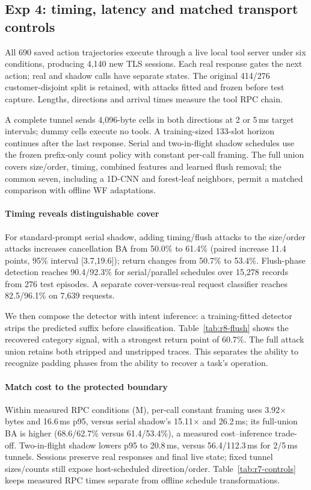 \subsection{Exp 4: timing, latency and matched transport controls}\label{sec:live-timing}\label{sec:r7-main}
All 690 saved action trajectories execute through a live local tool server under six conditions, producing 4,140 new TLS sessions. Each real response gates the next action; real and shadow calls have separate states. The original 414/276 customer-disjoint split is retained, with attacks fitted and frozen before test capture. Lengths, directions and arrival times measure the tool RPC chain.

A complete tunnel sends 4,096-byte cells in both directions at 2 or 5\,ms target intervals; dummy cells execute no tools. A training-sized 133-slot horizon continues after the last response. Serial and two-in-flight shadow schedules use the frozen prefix-only count policy with constant per-call framing. The full union covers size/order, timing, combined features and learned flush removal; the common seven, including a 1D-CNN and forest-leaf neighbors, permit a matched comparison with offline WF adaptations.


\paragraph{Timing reveals distinguishable cover}
For standard-prompt serial shadow, adding timing/flush attacks to the size/order attacks increases cancellation BA from 50.0\% to 61.4\% (paired increase 11.4 points, 95\% interval [3.7,19.6]); return changes from 50.7\% to 53.4\%. Flush-phase detection reaches 90.4/92.3\% for serial/parallel schedules over 15,278 records from 276 test episodes. A separate cover-versus-real request classifier reaches 82.5/96.1\% on 7,639 requests.

We then compose the detector with intent inference: a training-fitted detector strips the predicted suffix before classification. Table~\ref{tab:r8-flush} shows the recovered category signal, with a strongest return point of 60.7\%. The full attack union retains both stripped and unstripped traces. This separates the ability to recognize padding phases from the ability to recover a task's operation.


\paragraph{Match cost to the protected boundary}
Within measured RPC conditions (M), per-call constant framing uses 3.92$\times$ bytes and 16.6\,ms p95, versus serial shadow's 15.11$\times$ and 26.2\,ms; its full-union BA is higher (68.6/62.7\% versus 61.4/53.4\%), a measured cost--inference trade-off. Two-in-flight shadow lowers p95 to 20.8\,ms, versus 56.4/112.3\,ms for 2/5\,ms tunnels. Sessions preserve real responses and final live state; fixed tunnel sizes/counts still expose host-scheduled direction/order. Table~\ref{tab:r7-controls} keeps measured RPC times separate from offline schedule transformations.

